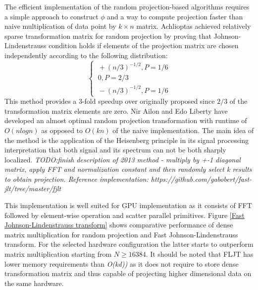 The efficient implementation of the random projection-based
algorithms requires a simple approach to construct $ \phi $ and a way to compute
projection faster than naive multiplication of data point by $k \times n $
matrix.
Achlioptas\cite{Achlioptas:2003:DRP:861182.861189} achieved relatively sparse
transformation matrix for random projection by proving that
Johnson-Lindenstrauss condition holds if elements of the projection matrix
are chosen independently according to the following distribution:
\[
\left \{ 
\begin{array}{lll} 
  \ +(n/3)^{-1/2}, P =  1/6 \\
  \ 0, P = 2/3 \\
  \ -(n/3)^{-1/2},P = 1/6   
 \end{array}
 \right.
\]
This method provides a 3-fold speedup over originally
proposed\cite{johnson84extensionslipschitz} since $ 2/3 $ of the transformation
matrix elements are zero.
Nir Ailon and Edo Liberty\cite{ailon2013almost} have developed an almost optimal
random projection transformation with runtime of $ O(n log n)$ as opposed to $ O(kn) $
of the naive implementation. The main idea of the method is the application of
the Heisenberg principle in its signal processing interpretation that both
signal and its spectrum can not be both sharply localized. \textit{TODO:finish
description of 2013 method - multiply by +-1 diagonal matrix, apply FFT and
normalization constant and then randomly select k results to obtain projection.
Reference implementation: https://github.com/gabobert/fast-jlt/tree/master/fjlt}

This implementation is well suited for GPU implementation as it consists of FFT
followed by element-wise operation and scatter parallel primitives.
Figure \ref{Fast Johnson-Lindenstrauss transform} shows comparative performance
of dense matrix multiplication for random projection and Fast
Johnson-Lindenstrauss transform. For the selected hardware configuration the
latter starts to outperform matrix multiplication starting from $ N \geq 16384
$. It should be noted that FLJT has lower memory requirements than
\textit{O(kd))} as it does not require to store dense transformation matrix and
thus capable of projecting higher dimensional data on the same hardware.

